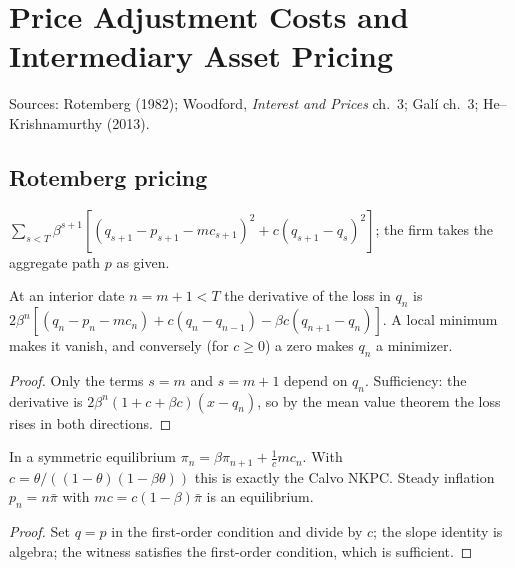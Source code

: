 \chapter{Price Adjustment Costs and Intermediary Asset Pricing}
\label{chap:pricing_intermediaries}

Sources: Rotemberg (1982); Woodford, \emph{Interest and Prices} ch.~3; Gal\'i ch.~3; He--Krishnamurthy (2013).

\section{Rotemberg pricing}

\begin{definition}
\label{def:rot}
\leanok
$\sum_{s<T}\beta^{s+1}[(q_{s+1}-p_{s+1}-mc_{s+1})^2+c(q_{s+1}-q_s)^2]$; the firm takes the aggregate path $p$ as given.
\end{definition}

\begin{theorem}
\label{thm:rot_foc}
\leanok
{}
At an interior date $n=m+1<T$ the derivative of the loss in $q_n$ is
$2\beta^n[(q_n-p_n-mc_n)+c(q_n-q_{n-1})-\beta c(q_{n+1}-q_n)]$. A local minimum makes it vanish, and conversely (for
$c\ge0$) a zero makes $q_n$ a minimizer.
\end{theorem}
\begin{proof}
\leanok
Only the terms $s=m$ and $s=m+1$ depend on $q_n$. Sufficiency: the derivative is
$2\beta^n(1+c+\beta c)(x-q_n)$, so by the mean value theorem the loss rises in both directions.
\end{proof}

\begin{theorem}
\label{thm:rot_nkpc}
\leanok
{}
In a symmetric equilibrium $\pi_n=\beta\pi_{n+1}+\frac1c mc_n$. With $c=\theta/((1-\theta)(1-\beta\theta))$ this is
exactly the Calvo NKPC. Steady inflation $p_n=n\bar\pi$ with $mc=c(1-\beta)\bar\pi$ is an equilibrium.
\end{theorem}
\begin{proof}
\leanok
Set $q=p$ in the first-order condition and divide by $c$; the slope identity is algebra; the witness satisfies the
first-order condition, which is sufficient.
\end{proof}

